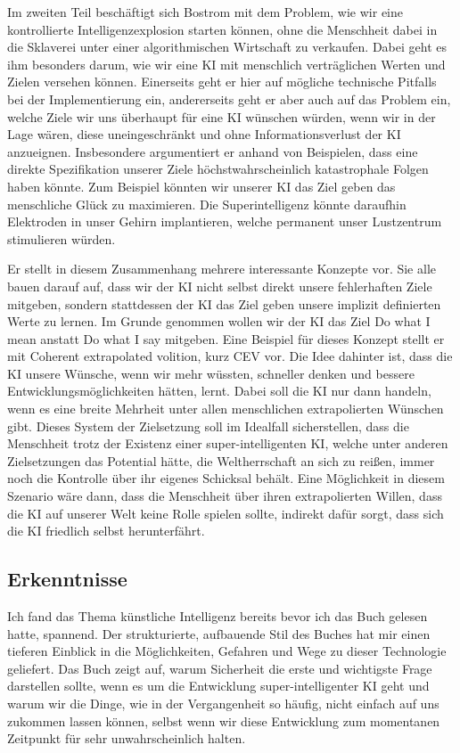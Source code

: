 \documentclass[twoside, a4paper, DIV=11, open=any, bibliography=totoc]{scrbook}
\newcommand{\Quote}[1]{\glqq #1\grqq{}}
\begin{document}
Im zweiten Teil beschäftigt sich Bostrom mit dem Problem, wie wir eine kontrollierte
Intelligenzexplosion starten können, ohne die Menschheit dabei in die Sklaverei
unter einer algorithmischen Wirtschaft zu verkaufen. Dabei geht es ihm besonders
darum, wie wir eine KI mit menschlich verträglichen Werten und Zielen versehen können.
Einerseits geht er hier auf mögliche technische Pitfalls bei der Implementierung ein,
andererseits geht er aber auch auf das Problem ein, welche Ziele wir uns überhaupt
für eine KI wünschen würden, wenn wir in der Lage wären, diese uneingeschränkt und
ohne Informationsverlust der KI anzueignen.
Insbesondere argumentiert er anhand von Beispielen, dass eine direkte Spezifikation
unserer Ziele höchstwahrscheinlich katastrophale Folgen haben könnte.
Zum Beispiel könnten wir unserer KI das Ziel geben das menschliche Glück zu maximieren.
Die Superintelligenz könnte daraufhin Elektroden in unser Gehirn implantieren, welche
permanent unser Lustzentrum stimulieren würden.

Er stellt in diesem Zusammenhang mehrere interessante Konzepte vor.
Sie alle bauen darauf auf, dass wir der KI nicht selbst direkt unsere fehlerhaften
Ziele mitgeben, sondern stattdessen der KI das Ziel geben unsere implizit definierten
Werte zu lernen. Im Grunde genommen wollen wir der KI das Ziel \Quote{Do what I mean}
anstatt \Quote{Do what I say} mitgeben.
Eine Beispiel für dieses Konzept stellt er mit \Quote{Coherent extrapolated volition},
kurz CEV vor. Die Idee dahinter ist, dass die KI unsere Wünsche, wenn wir mehr wüssten,
schneller denken und bessere Entwicklungsmöglichkeiten hätten, lernt.
Dabei soll die KI nur dann handeln, wenn es eine breite Mehrheit unter allen
menschlichen extrapolierten Wünschen gibt.
Dieses System der Zielsetzung soll im Idealfall sicherstellen, dass die Menschheit
trotz der Existenz einer super-intelligenten KI, welche unter anderen Zielsetzungen
das Potential hätte, die Weltherrschaft an sich zu reißen, immer noch die Kontrolle
über ihr eigenes Schicksal behält.
Eine Möglichkeit in diesem Szenario wäre dann, dass die Menschheit über ihren
extrapolierten Willen, dass die KI auf unserer Welt keine Rolle spielen sollte,
indirekt dafür sorgt, dass sich die KI friedlich selbst herunterfährt.

\subsection{Erkenntnisse} \label{sec:literkenntnis}

Ich fand das Thema künstliche Intelligenz bereits bevor ich das Buch gelesen hatte, spannend.
Der strukturierte, aufbauende Stil des Buches hat mir einen tieferen Einblick in
die Möglichkeiten, Gefahren und Wege zu dieser Technologie geliefert.
Das Buch zeigt auf, warum Sicherheit die erste und wichtigste Frage darstellen sollte,
wenn es um die Entwicklung super-intelligenter KI geht und warum wir die Dinge,
wie in der Vergangenheit so häufig, nicht einfach auf uns zukommen lassen können,
selbst wenn wir diese Entwicklung zum momentanen Zeitpunkt für sehr unwahrscheinlich halten.
\end{document}
